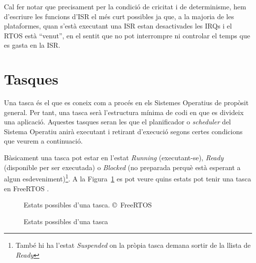 Cal fer notar que precisament per la condició de cricitat i de determinisme, hem d'escriure les funcions d'\gls{ISR} el més curt possibles ja que, a la majoria de les plataformes, quan s'està executant una ISR estan desactivades les \glspl{IRQ} i el RTOS està ``venut'', en el sentit que no pot interrompre ni controlar el temps que es gasta en la ISR.

\section{Tasques}

Una tasca és el que es coneix com a procés en els Sistemes Operatius de propòsit general. Per tant, una tasca serà l'estructura mínima de codi en que es divideix una aplicació. Aquestes tasques seran les que el planificador o {\em scheduler} del Sistema Operatiu anirà executant i retirant d'execució segons certes condicions que veurem a continuació.

Bàsicament una tasca pot estar en l'estat {\em Running} (executant-se), {\em Ready} (disponible per ser executada) o {\em Blocked} (no preparada perquè està esperant a algun esdeveniment)\footnote{També hi ha l'estat {\em Suspended} on la pròpia tasca demana sortir de la llista de {\em Ready}}. A la Figura~\ref{fig:taskstate} es pot veure quins estats pot tenir una tasca en FreeRTOS \cite[92]{FreeRTOSBook}.


\begin{figure}
 \centering
 \caption{Estats possibles d'una tasca}{Estats possibles d'una tasca. \copyright\ FreeRTOS}
 \label{fig:taskstate}
\end{figure}

